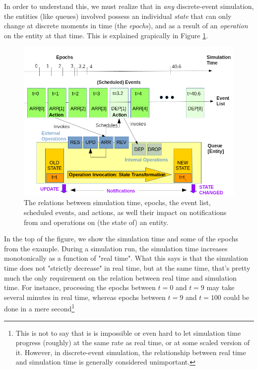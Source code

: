 \documentclass[12pt]{book}
\begin{document}
In order to understand this,
  we must realize that in {\em any\/} discrete-event simulation,
  the entities (like queues) involved possess an individual {\em state\/}
  that can only change at discrete moments in time (the {\em epochs\/}),
  and as a result of an {\em operation\/} on the entity at that time.
This is explained grapically in Figure \ref{fig:SimpleSimulationOverview}.

\begin{figure}[h]
\label{fig:SimpleSimulationOverview}
\caption{The relations between simulation time, epochs,
	 the event list, scheduled events, and actions,
	 as well their impact on notifications from
	 and operations on
	 (the state of) an entity.}
\includegraphics[width=\textwidth]{SimpleSimulationOverview}
\end{figure}

In the top of the figure,
  we show the simulation time and some of the epochs
  from the example.
During a simulation run, the simulation time increases monotonically
  as a function of "real time".
What this says is that the simulation time does not
  "strictly decrease" in real time,
  but at the same time,
  that's pretty much the only requirement
  on the relation between real time
  and simulation time.
For instance,
  processing the epochs between $t=0$ and $t=9$
  may take several minutes in real time,
  whereas epochs between $t=9$ and $t=100$
  could be done in a mere second\footnote{
This is not to say that is is impossible or even hard
  to let simulation time progress
  (roughly) at the same rate as real time,
  or at some scaled version of it.
However, in discrete-event simulation,
  the relationship between real time and simulation time
  is generally considered unimportant.}
\end{document}
